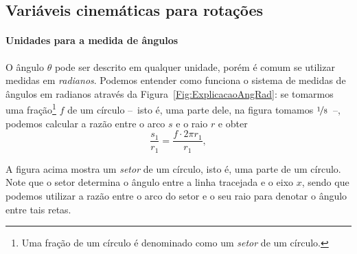 \subsection{Variáveis cinemáticas para rotações}


\paragraph{Unidades para a medida de ângulos}

O ângulo $\theta$ pode ser descrito em qualquer unidade, porém é comum se utilizar medidas em \emph{radianos}. Podemos entender como funciona o sistema de medidas de ângulos em radianos através da Figura~\ref{Fig:ExplicacaoAngRad}: se tomarmos uma fração\footnote{Uma fração de um círculo é denominado como um \emph{setor} de um círculo.} $f$ de um círculo --~isto é, uma parte dele, na figura tomamos $\nicefrac{1}{8}$~--, podemos calcular a razão entre o arco $s$ e o raio $r$ e obter
\begin{equation}
    \frac{s_1}{r_1} = \frac{f\cdot 2\pi r_1}{r_1},
\end{equation}
%
\begin{marginfigure}
\centering
{}
\caption{A figura acima mostra um \emph{setor} de um círculo, isto é, uma parte de um círculo. Note que o setor determina o ângulo entre a linha tracejada e o eixo $x$, sendo que podemos utilizar a razão entre o arco do setor e o seu raio para denotar o ângulo entre tais retas. \label{Fig:ExplicacaoAngRad}}
\end{marginfigure}


